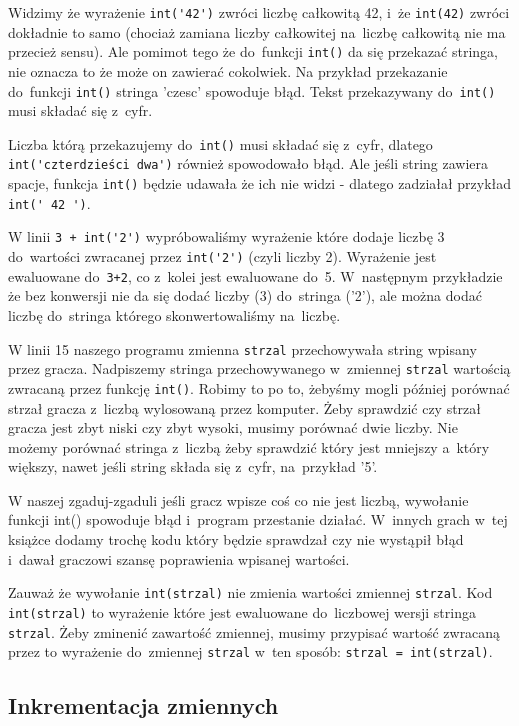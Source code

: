 \documentclass{book}
\begin{document}
Widzimy że wyrażenie \lstinline{int('42')} zwróci liczbę całkowitą 42, i~że \lstinline{int(42)} zwróci dokładnie to samo (chociaż zamiana liczby całkowitej na~liczbę całkowitą nie ma przecież sensu). Ale pomimot tego że do~funkcji \lstinline{int()} da się przekazać stringa, nie oznacza to że może on zawierać cokolwiek. Na przykład przekazanie do~funkcji \lstinline{int()} stringa 'czesc' spowoduje błąd. Tekst przekazywany do~\lstinline{int()} musi składać się z~cyfr.


Liczba którą przekazujemy do~\lstinline{int()} musi składać się z~cyfr, dlatego \lstinline{int('czterdzieści dwa')} również spowodowało błąd. Ale jeśli string zawiera spacje, funkcja \lstinline{int()} będzie udawała że ich nie widzi - dlatego zadziałał przykład \lstinline{int(' 42 ')}.

W linii \lstinline{3 + int('2')} wypróbowaliśmy wyrażenie które dodaje liczbę 3 do~wartości zwracanej przez \lstinline{int('2')} (czyli liczby 2). Wyrażenie jest ewaluowane do~\lstinline{3+2}, co z~kolei jest ewaluowane do~5. W~następnym przykładzie że bez konwersji nie da się dodać liczby (3) do~stringa ('2'), ale można dodać liczbę do~stringa którego skonwertowaliśmy na~liczbę.

W linii 15 naszego programu zmienna \lstinline{strzal} przechowywała string wpisany przez gracza. Nadpiszemy stringa przechowywanego w~zmiennej \lstinline{strzal} wartością zwracaną przez funkcję \lstinline{int()}. Robimy to po to, żebyśmy mogli później porównać strzał gracza z~liczbą wylosowaną przez komputer. Żeby sprawdzić czy strzał gracza jest zbyt niski czy zbyt wysoki, musimy porównać dwie liczby. Nie możemy porównać stringa z~liczbą żeby sprawdzić który jest mniejszy a~który większy, nawet jeśli string składa się z~cyfr, na~przykład '5'.

W naszej zgaduj-zgaduli jeśli gracz wpisze coś co nie jest liczbą, wywołanie funkcji int() spowoduje błąd i~program przestanie działać. W~innych grach w~tej książce dodamy trochę kodu który będzie sprawdzał czy nie wystąpił błąd i~dawał graczowi szansę poprawienia wpisanej wartości.

Zauważ że wywołanie \lstinline{int(strzal)} nie zmienia wartości zmiennej \lstinline{strzal}. Kod \lstinline{int(strzal)} to wyrażenie które jest ewaluowane do~liczbowej wersji stringa \lstinline{strzal}. Żeby zminenić zawartość zmiennej, musimy przypisać wartość zwracaną przez to wyrażenie do~zmiennej \lstinline{strzal} w~ten sposób: \lstinline{strzal = int(strzal)}.

\subsection{Inkrementacja zmiennych}
\end{document}
